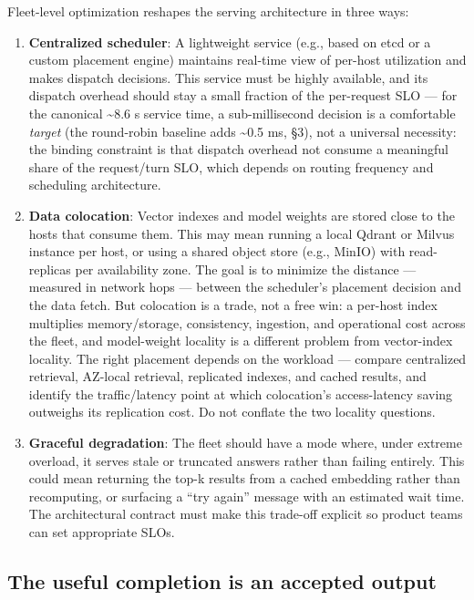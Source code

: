 Fleet-level optimization reshapes the serving architecture in three
ways:

\begin{enumerate}
\def\labelenumi{\arabic{enumi}.}
\item
  \textbf{Centralized scheduler}: A lightweight service (e.g., based on
  etcd or a custom placement engine) maintains real-time view of
  per-host utilization and makes dispatch decisions. This service must
  be highly available, and its dispatch overhead should stay a small
  fraction of the per-request SLO --- for the canonical
  \textasciitilde8.6 s service time, a sub-millisecond decision is a
  comfortable \emph{target} (the round-robin baseline adds
  \textasciitilde0.5 ms, §3), not a universal necessity: the binding
  constraint is that dispatch overhead not consume a meaningful share of
  the request/turn SLO, which depends on routing frequency and
  scheduling architecture.
\item
  \textbf{Data colocation}: Vector indexes and model weights are stored
  close to the hosts that consume them. This may mean running a local
  Qdrant or Milvus instance per host, or using a shared object store
  (e.g., MinIO) with read-replicas per availability zone. The goal is to
  minimize the distance --- measured in network hops --- between the
  scheduler's placement decision and the data fetch. But colocation is a
  trade, not a free win: a per-host index multiplies memory/storage,
  consistency, ingestion, and operational cost across the fleet, and
  model-weight locality is a different problem from vector-index
  locality. The right placement depends on the workload --- compare
  centralized retrieval, AZ-local retrieval, replicated indexes, and
  cached results, and identify the traffic/latency point at which
  colocation's access-latency saving outweighs its replication cost. Do
  not conflate the two locality questions.
\item
  \textbf{Graceful degradation}: The fleet should have a mode where,
  under extreme overload, it serves stale or truncated answers rather
  than failing entirely. This could mean returning the top-k results
  from a cached embedding rather than recomputing, or surfacing a ``try
  again'' message with an estimated wait time. The architectural
  contract must make this trade-off explicit so product teams can set
  appropriate SLOs.
\end{enumerate}

\subsection{The useful completion is an accepted
output}\label{the-useful-completion-is-an-accepted-output}

